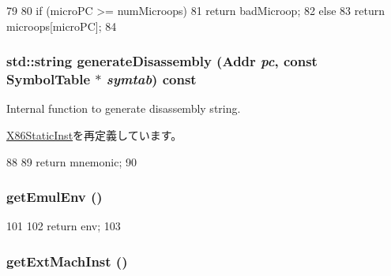 \begin{DoxyCode}
79     {
80         if (microPC >= numMicroops)
81             return badMicroop;
82         else
83             return microops[microPC];
84     }
\end{DoxyCode}
\hypertarget{classX86ISA_1_1MacroopBase_a95d323a22a5f07e14d6b4c9385a91896}{
\subsubsection[{generateDisassembly}]{\setlength{\rightskip}{0pt plus 5cm}std::string generateDisassembly ({\bf Addr} {\em pc}, \/  const {\bf SymbolTable} $\ast$ {\em symtab}) const}}
\label{classX86ISA_1_1MacroopBase_a95d323a22a5f07e14d6b4c9385a91896}
Internal function to generate disassembly string. 

\hyperlink{classX86ISA_1_1X86StaticInst_a95d323a22a5f07e14d6b4c9385a91896}{X86StaticInst}を再定義しています。


\begin{DoxyCode}
88     {
89         return mnemonic;
90     }
\end{DoxyCode}
\hypertarget{classX86ISA_1_1MacroopBase_acb5d989461a0c60d083cf4313557d904}{
\subsubsection[{getEmulEnv}]{ getEmulEnv ()}}
\label{classX86ISA_1_1MacroopBase_acb5d989461a0c60d083cf4313557d904}



\begin{DoxyCode}
101     {
102         return env;
103     }
\end{DoxyCode}
\hypertarget{classX86ISA_1_1MacroopBase_ae1f54d17eef66872a0472678ae93adce}{
\subsubsection[{getExtMachInst}]{ getExtMachInst ()}}
\label{classX86ISA_1_1MacroopBase_ae1f54d17eef66872a0472678ae93adce}



